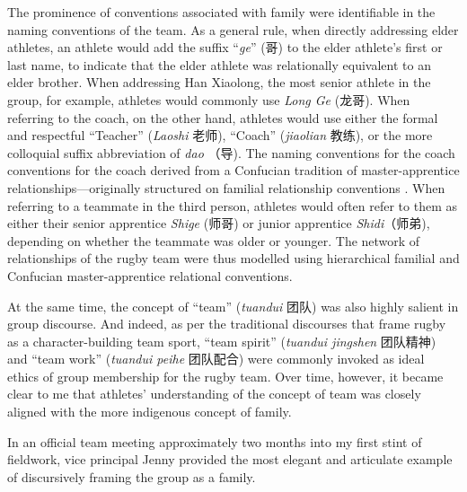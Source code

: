 \begin{CJK}{UTF8}{gbsn}
The prominence of conventions associated with family were identifiable in the naming conventions of the team.  As a general rule, when directly addressing elder athletes, an athlete would add the suffix ``\textit{ge}'' (哥) to the elder athlete's first or last name, to indicate that the elder athlete was relationally equivalent to an elder brother.  When addressing Han Xiaolong, the most senior athlete in the group, for example, athletes would commonly use \textit{Long Ge} (龙哥).  When referring to the coach, on the other hand, athletes would use either the formal and respectful ``Teacher'' (\textit{Laoshi} 老师), ``Coach'' (\textit{jiaolian} 教练), or the more colloquial suffix abbreviation of \textit{dao} （导). The naming conventions for the coach conventions for the coach derived from a Confucian tradition of master-apprentice relationships---originally structured on familial relationship conventions \citep{Spence1999}. When referring to a teammate in the third person, athletes would often refer to them as either their senior apprentice \textit{Shige} (师哥) or junior apprentice \textit{Shidi}（师弟), depending on whether the teammate was older or younger.  The network of relationships of the rugby team were thus modelled using hierarchical familial and Confucian master-apprentice relational conventions.

At the same time, the concept of ``team'' (\textit{tuandui} 团队) was also highly salient in group discourse. And indeed, as per the traditional discourses that frame rugby as a character-building team sport, ``team spirit'' (\textit{tuandui jingshen} 团队精神) and ``team work'' (\textit{tuandui peihe} 团队配合) were commonly invoked as ideal ethics of group membership for the rugby team.   Over time, however, it became clear to me that athletes' understanding of the concept of team was closely aligned with the more indigenous concept of family.

In an official team meeting approximately two months into my first stint of fieldwork, vice principal Jenny provided the most elegant and articulate example of discursively framing the group as a family.


\end{CJK}
